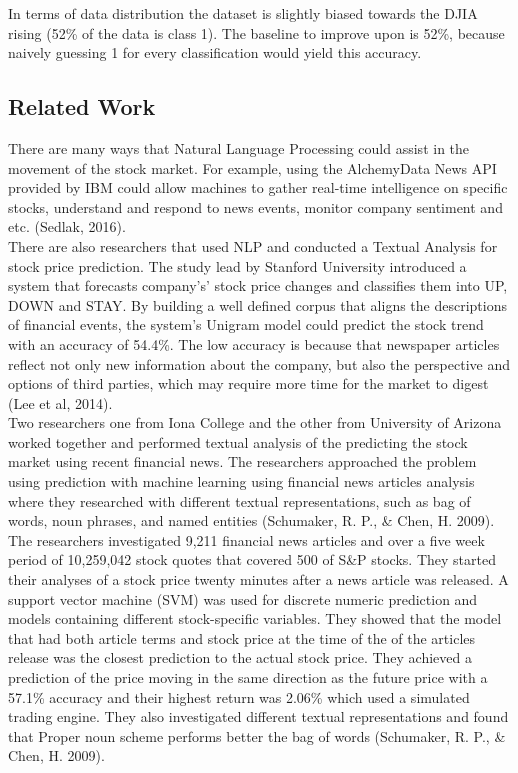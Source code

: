 \documentclass[11pt,a4paper]{article}
\begin{document}
In terms of data distribution the dataset is slightly biased towards the DJIA rising (52\% of the data is class 1). The baseline to improve upon is 52\%, because naively guessing 1 for every classification would yield this accuracy.\\


\subsection{Related Work}
There are many ways that Natural Language Processing could assist in the movement of the  stock market. For example, using the AlchemyData News API provided by IBM could allow machines to gather real-time intelligence on specific stocks, understand and respond to news events, monitor company sentiment and etc. (Sedlak, 2016).\\

There are also researchers that used NLP and conducted a Textual Analysis for stock price prediction. The study lead by Stanford University introduced a system that forecasts company's’ stock price changes and classifies them into UP, DOWN and STAY. By building a well defined corpus that aligns the descriptions of financial events, the system’s Unigram model could predict the stock trend with an accuracy of 54.4\%. The low accuracy is because that  newspaper articles reflect not only new information about the company, but also the perspective and options of third parties, which may require more time for the market to digest (Lee et al, 2014).\\

Two researchers one from Iona College and the other from University of Arizona worked together and performed textual analysis of the predicting the stock market using recent financial news. The researchers approached the problem using prediction with machine learning using financial news articles analysis where they researched with different textual representations, such as bag of words, noun phrases, and named entities (Schumaker, R. P., \& Chen, H. 2009).\\

The researchers investigated 9,211 financial news articles and over a five week period of 10,259,042 stock quotes that covered 500 of S\&P stocks. They started their analyses of a stock price twenty minutes after a news article was released. A support vector machine (SVM) was used for discrete numeric prediction and models containing different stock-specific variables. They showed that the model that had both article terms and stock price at the time of the of the articles release was the closest prediction to the actual stock price. They achieved a prediction of the price moving in the same direction as the future price with a 57.1\% accuracy and their highest return was 2.06\% which used a simulated trading engine. They also investigated different textual representations and found that Proper noun scheme performs better the bag of words (Schumaker, R. P., \& Chen, H. 2009).\\
\end{document}

